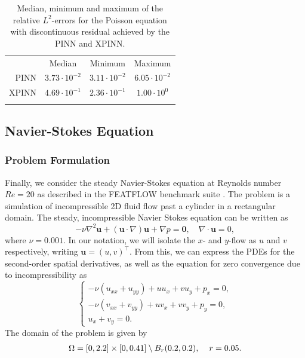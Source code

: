 \begin{table}[h!]
\caption{Median, minimum and maximum of the relative $L^2$-errors for the Poisson equation with discontinuous residual achieved by the PINN and XPINN.}
\centering
\begin{tabular}{r|c|c|c}\toprule
     & Median & Minimum & Maximum \\
    \colrule
    PINN & $3.73 \cdot 10^{-2}$ & $3.11 \cdot 10^{-2}$ & $6.05 \cdot 10^{-2}$ \\
    XPINN & $4.69 \cdot 10^{-1} $ &  $2.36 \cdot 10^{-1}$ & $1.00 \cdot 10^{0}$ \\
    \botrule
\end{tabular}
\label{table:discont_poisson}
\end{table}
\vfill\null

\subsection{Navier-Stokes Equation}
\subsubsection{Problem Formulation}
Finally, we consider the steady Navier-Stokes equation at Reynolds number $Re = 20$ as described in the FEATFLOW benchmark suite \cite{DFG}.
The problem is a simulation of incompressible 2D fluid flow past a cylinder in a rectangular domain.
The steady, incompressible Navier Stokes equation can be written as
\begin{equation}\label{eq:NS}
    -\nu \nabla^2 \mathbf{u} + (\mathbf{u} \cdot \nabla)\mathbf{u} + \nabla p = \mathbf{0}, \quad \nabla \cdot \mathbf{u} = 0,
\end{equation}
where $\nu = 0.001$.
In our notation, we will isolate the $x$- and $y$-flow as $u$ and $v$ respectively, writing $\mathbf{u} = (u,v)^\intercal$.
From this, we can express the PDEs for the second-order spatial derivatives, as well as the equation for zero convergence due to incompressibility as
\begin{equation}
\begin{cases}
-\nu(u_{xx} + u_{yy})+uu_x+vu_y+p_x = 0, \\
-\nu(v_{xx} + v_{yy})+uv_x+vv_y+p_y = 0, \\
u_x + v_y = 0.
\end{cases}
\end{equation}
The domain of the problem is given by %
\begin{align*}
    \Omega = [0,2.2] \times [0,0.41] \setminus B_r(0.2,0.2), \hspace{4mm} r = 0.05.
\end{align*}

